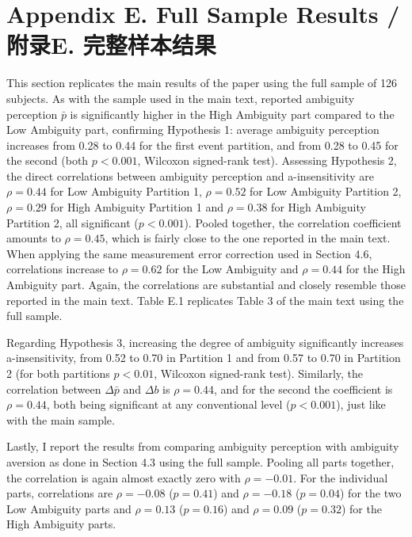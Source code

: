 \documentclass[12pt,a4paper]{article}
\newenvironment{original}
  {\par\medskip\noindent\color{black}\ignorespaces}
  {\par\medskip}
\begin{document}
\newpage
\section*{Appendix E. Full Sample Results / 附录E. 完整样本结果}

\begin{original}
This section replicates the main results of the paper using the full sample of 126 subjects. As with the sample used in the main text, reported ambiguity perception $\bar{p}$ is significantly higher in the High Ambiguity part compared to the Low Ambiguity part, confirming Hypothesis 1: average ambiguity perception increases from 0.28 to 0.44 for the first event partition, and from 0.28 to 0.45 for the second (both $p < 0.001$, Wilcoxon signed-rank test). Assessing Hypothesis 2, the direct correlations between ambiguity perception and a-insensitivity are $\rho = 0.44$ for Low Ambiguity Partition 1, $\rho = 0.52$ for Low Ambiguity Partition 2, $\rho = 0.29$ for High Ambiguity Partition 1 and $\rho = 0.38$ for High Ambiguity Partition 2, all significant ($p < 0.001$). Pooled together, the correlation coefficient amounts to $\rho = 0.45$, which is fairly close to the one reported in the main text. When applying the same measurement error correction used in Section 4.6, correlations increase to $\rho = 0.62$ for the Low Ambiguity and $\rho = 0.44$ for the High Ambiguity part. Again, the correlations are substantial and closely resemble those reported in the main text. Table E.1 replicates Table 3 of the main text using the full sample.

Regarding Hypothesis 3, increasing the degree of ambiguity significantly increases a-insensitivity, from 0.52 to 0.70 in Partition 1 and from 0.57 to 0.70 in Partition 2 (for both partitions $p < 0.01$, Wilcoxon signed-rank test). Similarly, the correlation between $\Delta \bar{p}$ and $\Delta b$ is $\rho = 0.44$, and for the second the coefficient is $\rho = 0.44$, both being significant at any conventional level ($p < 0.001$), just like with the main sample.

Lastly, I report the results from comparing ambiguity perception with ambiguity aversion as done in Section 4.3 using the full sample. Pooling all parts together, the correlation is again almost exactly zero with $\rho = -0.01$. For the individual parts, correlations are $\rho = -0.08$ ($p = 0.41$) and $\rho = -0.18$ ($p = 0.04$) for the two Low Ambiguity parts and $\rho = 0.13$ ($p = 0.16$) and $\rho = 0.09$ ($p = 0.32$) for the High Ambiguity parts.
\end{original}
\end{document}
